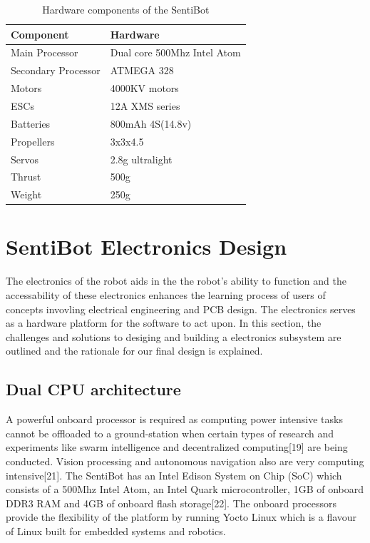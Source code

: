 \documentclass[12pt]{article}
\begin{document}
\begin{table}[h]
	\centering
	\begin{tabular}{ | l | l | }
		Component & Hardware \\
		\hline
		Main Processor & Dual core 500Mhz Intel Atom \\
		Secondary Processor & ATMEGA 328 \\
		Motors & 4000KV motors \\
		ESCs & 12A XMS series \\
		Batteries & 800mAh 4S(14.8v) \\
		Propellers & 3x3x4.5 \\
		Servos & 2.8g ultralight \\
		Thrust & 500g \\
		Weight & 250g \\
	\end{tabular}
	\caption{Hardware components of the SentiBot}
	\label{fig:components}
\end{table}

\section{SentiBot Electronics Design}

The electronics of the robot aids in the the robot's ability to function and the accessability of these electronics enhances the learning process of users of concepts invovling electrical engineering and PCB design. The electronics serves as a hardware platform for the software to act upon. In this section, the challenges and solutions to desiging and building a electronics subsystem are outlined and the rationale for our final design is explained.

\subsection{Dual CPU architecture}

A powerful onboard processor is required as computing power intensive tasks cannot be offloaded to a ground-station when certain types of research and experiments like swarm intelligence and decentralized computing[19] are being conducted. Vision processing and autonomous navigation also are very computing intensive[21]. The SentiBot has an Intel Edison System on Chip (SoC) which consists of a 500Mhz Intel Atom, an Intel Quark microcontroller, 1GB of onboard DDR3 RAM and 4GB of onboard flash storage[22]. The onboard processors provide the flexibility of the platform by running Yocto Linux which is a flavour of Linux built for embedded systems and robotics. 
\end{document}

